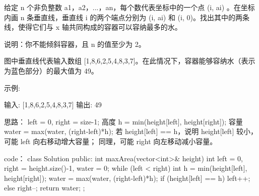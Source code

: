 给定 n 个非负整数 a1，a2，...，an，每个数代表坐标中的一个点 (i, ai) 。在坐标内画 n 条垂直线，垂直线 i 的两个端点分别为 (i, ai) 和 (i, 0)。找出其中的两条线，使得它们与 x 轴共同构成的容器可以容纳最多的水。

说明：你不能倾斜容器，且 n 的值至少为 2。

图中垂直线代表输入数组 [1,8,6,2,5,4,8,3,7]。在此情况下，容器能够容纳水（表示为蓝色部分）的最大值为 49。

 

示例:

输入: [1,8,6,2,5,4,8,3,7]
输出: 49




































思路：
left = 0, right = size-1;
高度 h = min(height[left], height[right]);
容量 water = max(water, (right-left)*h);
若 height[left] == h，说明 height[left] 较小，可能 left 向右移动增大容量；
同理，可能 right 向左移动减小容量。








































code：
class Solution {
public:
    int maxArea(vector<int>& height) {
        int left = 0, right = height.size()-1, water = 0;
        while (left < right) {
            int h = min(height[left], height[right]);
            water = max(water, (right-left)*h);
            if (height[left] == h) left++;
            else right--;
        }
        return water;
    }
};